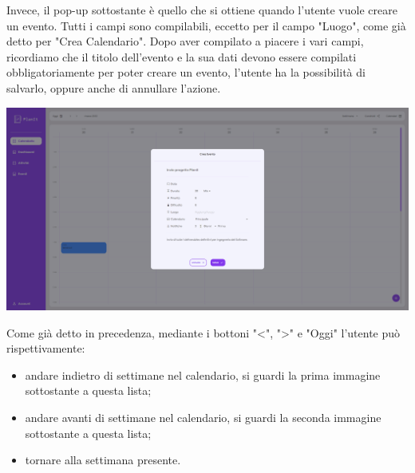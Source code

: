 Invece, il pop-up sottostante è quello che si ottiene quando l'utente vuole creare un evento. Tutti i campi sono compilabili, eccetto per il campo "Luogo", come già detto per "Crea Calendario". Dopo aver compilato a piacere i vari campi, ricordiamo che il titolo dell'evento e la sua dati devono essere compilati obbligatoriamente per poter creare un evento, l'utente ha la possibilità di salvarlo, oppure anche di annullare l'azione.

\begin{center}
    \includegraphics[width=1\textwidth, height=0.3\textheight]{img/png/FrontEnd/Calendario/calendario_creaEvento.png}
\end{center}

Come già detto in precedenza, mediante i bottoni "<", ">" e "Oggi" l'utente può rispettivamente:
\begin{itemize}
    \item andare indietro di settimane nel calendario, si guardi la prima immagine sottostante a questa lista;
    \item andare avanti di settimane nel calendario, si guardi la seconda immagine sottostante a questa lista;
    \item tornare alla settimana presente.
\end{itemize}


